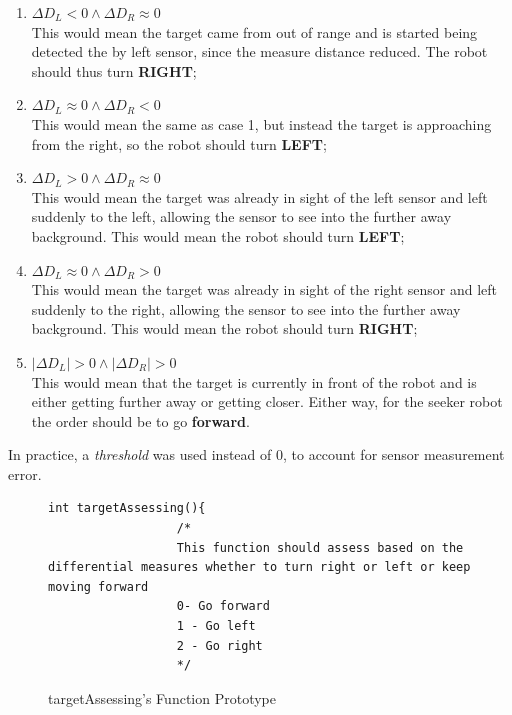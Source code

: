 \documentclass{report}
\begin{document}
\begin{enumerate}
     \item $\Delta D_L<0 \wedge \Delta D_R \approx 0$ \\ This would mean the
     target came from out of range and is started being detected the by left
     sensor, since the measure distance reduced. The robot should thus
     turn \textbf{RIGHT};
     
     \item $\Delta D_L\approx 0\wedge \Delta D_R < 0$ \\ This would mean the same
     as case 1, but instead the target is approaching from the right, so the
     robot should turn \textbf{LEFT};

     \item $\Delta D_L>0\wedge \Delta D_R \approx 0$ \\ This would mean the
     target was already in sight of the left sensor and left suddenly to the
     left, allowing the sensor to see into the further away background. This
     would mean the robot should turn \textbf{LEFT};
     
     \item $\Delta D_L\approx 0 \wedge \Delta D_R > 0$ \\ This would mean the
     target was already in sight of the right sensor and left suddenly to the
     right, allowing the sensor to see into the further away background. This
     would mean the robot should turn \textbf{RIGHT};

     \item $|\Delta D_L|>0\wedge |\Delta D_R| > 0$ \\ This would mean that the
     target is currently in front of the robot and is either getting further
     away or getting closer. Either way, for the seeker robot the order should
     be to go \textbf{forward}.
\end{enumerate}

In practice, a \textit{threshold} was used instead of 0, to account for sensor
measurement error.

\begin{figure}[ht]
      \begin{lstlisting}[style = C_style]
            int targetAssessing(){
                  /*
                  This function should assess based on the differential measures whether to turn right or left or keep moving forward
                  0- Go forward
                  1 - Go left
                  2 - Go right
                  */  
            \end{lstlisting}
            \caption{\label{fig:targetAssessing} targetAssessing's
            Function Prototype}
\end{figure}
\end{document}
